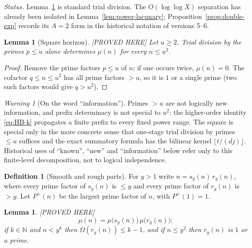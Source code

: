 \documentclass[11pt]{amsart}
\numberwithin{equation}{section}
\theoremstyle{plain}
\newtheorem{lemma}[theorem]{Lemma}
\theoremstyle{definition}
\newtheorem{definition}[theorem]{Definition}
\theoremstyle{remark}
\newtheorem{warning}[theorem]{Warning}
\newcommand{\Pp}{P^{+}}
\begin{document}
\noindent\emph{Status.} Lemma~\ref{lem:square-horizon} is standard trial
division. The $O(\log\log X)$ separation has already been isolated in
Lemma~\ref{lem:power-lacunary}; Proposition~\ref{prop:double-exp} records its
$A=2$ form in the historical notation of versions 5--6.

\begin{lemma}[Square horizon]
\label{lem:square-horizon}
\emph{[PROVED HERE]} Let $u\ge2$. Trial division by the primes $p\le u$
alone determines $\mu(n)$ for every $n\le u^2$.
\end{lemma}

\begin{proof}
Remove the prime factors $p\le u$ of $n$; if one occurs twice, $\mu(n)=0$.
The cofactor $q\le n\le u^2$ has all prime factors $>u$, so it is $1$ or a
single prime (two such factors would give $q>u^2$).
\end{proof}

\begin{warning}[On the word ``information'']
\label{warn:information_language}
Primes $>u$ are not logically new information, and prefix determinacy is not
special to $u^2$: the higher-order identity \eqref{eq:HB-k} propagates a
finite prefix to every fixed power range.  The square is special only in the
more concrete sense that one-stage trial division by primes $\le u$ suffices
and the exact summatory formula has the bilinear kernel
$\lfloor t/(dj)\rfloor$.  Historical uses of ``known'', ``new'' and
``information'' below refer only to this finite-level decomposition, not to
logical independence.
\end{warning}

\begin{definition}[Smooth and rough parts]
\label{def:smooth_rough}
For $y>1$ write $n=s_y(n)\,r_y(n)$, where every prime factor of $s_y(n)$
is $\le y$ and every prime factor of $r_y(n)$ is $>y$. Let $\Pp(n)$ be the
largest prime factor of $n$, with $\Pp(1)=1$.
\end{definition}

\begin{lemma}
\label{lem:rough_part}
\emph{[PROVED HERE]}
\begin{equation}
\label{eq:mu_split}
  \mu(n)=\mu\bigl(s_y(n)\bigr)\,\mu\bigl(r_y(n)\bigr);
\end{equation}
if $k\in\mathbb N$ and $n<y^k$ then $\Omega(r_y(n))\le k-1$, and if $n\le y^2$ then $r_y(n)$ is
$1$ or a prime.
\end{lemma}
\end{document}
